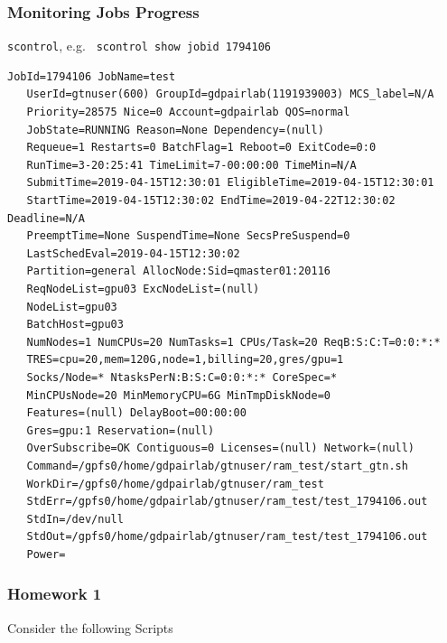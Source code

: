 \documentclass{beamer}
\newcommand{\code}[1]{\colorbox{codegray}{\texttt{#1}}}
\begin{document}
\begin{frame}[fragile]
\frametitle{Monitoring Jobs Progress}
\code{scontrol}, e.g. \code{ scontrol show jobid 1794106}
\begingroup
\tiny
\begin{lstlisting}[backgroundcolor = \color{codegray},showstringspaces=false]
JobId=1794106 JobName=test
   UserId=gtnuser(600) GroupId=gdpairlab(1191939003) MCS_label=N/A
   Priority=28575 Nice=0 Account=gdpairlab QOS=normal
   JobState=RUNNING Reason=None Dependency=(null)
   Requeue=1 Restarts=0 BatchFlag=1 Reboot=0 ExitCode=0:0
   RunTime=3-20:25:41 TimeLimit=7-00:00:00 TimeMin=N/A
   SubmitTime=2019-04-15T12:30:01 EligibleTime=2019-04-15T12:30:01
   StartTime=2019-04-15T12:30:02 EndTime=2019-04-22T12:30:02 Deadline=N/A
   PreemptTime=None SuspendTime=None SecsPreSuspend=0
   LastSchedEval=2019-04-15T12:30:02
   Partition=general AllocNode:Sid=qmaster01:20116
   ReqNodeList=gpu03 ExcNodeList=(null)
   NodeList=gpu03
   BatchHost=gpu03
   NumNodes=1 NumCPUs=20 NumTasks=1 CPUs/Task=20 ReqB:S:C:T=0:0:*:*
   TRES=cpu=20,mem=120G,node=1,billing=20,gres/gpu=1
   Socks/Node=* NtasksPerN:B:S:C=0:0:*:* CoreSpec=*
   MinCPUsNode=20 MinMemoryCPU=6G MinTmpDiskNode=0
   Features=(null) DelayBoot=00:00:00
   Gres=gpu:1 Reservation=(null)
   OverSubscribe=OK Contiguous=0 Licenses=(null) Network=(null)
   Command=/gpfs0/home/gdpairlab/gtnuser/ram_test/start_gtn.sh
   WorkDir=/gpfs0/home/gdpairlab/gtnuser/ram_test
   StdErr=/gpfs0/home/gdpairlab/gtnuser/ram_test/test_1794106.out
   StdIn=/dev/null
   StdOut=/gpfs0/home/gdpairlab/gtnuser/ram_test/test_1794106.out
   Power=
\end{lstlisting}
\endgroup
\end{frame}




\begin{frame}[fragile]
\frametitle{Homework 1}
Consider the following Scripts
\begingroup
\tiny
\begin{lstlisting}[backgroundcolor = \color{codegray},showstringspaces=false, language=Bash]

\end{lstlisting}
\endgroup
\end{frame}
\end{document}
